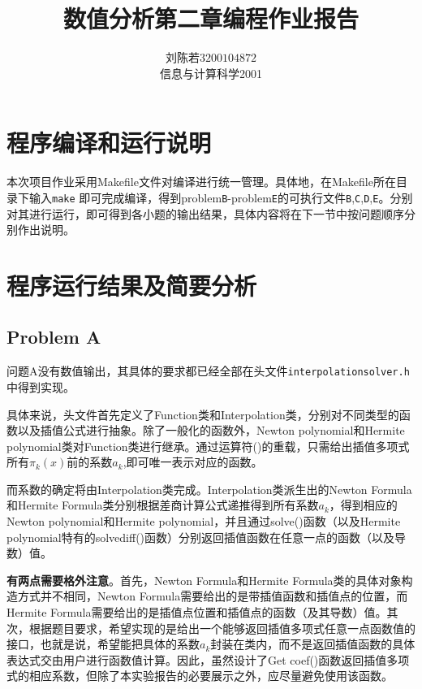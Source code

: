 \documentclass{ctexart}
\begin{document}
\begin{sloppypar}
\title{\vspace{-3cm} \textbf{数值分析第二章编程作业报告}}
\author{刘陈若\;$3200104872$\\信息与计算科学2001}
\date{}

\maketitle

\section*{程序编译和运行说明}
本次项目作业采用Makefile文件对编译进行统一管理。具体地，在Makefile所在目录下输入\verb|make|
即可完成编译，得到problem\verb|B|-problem\verb|E|的可执行文件\verb|B|,\verb|C|,\verb|D|,\verb|E|。分别对其进行运行，即可得到各小题的输出结果，具体内容将在下一节中按问题顺序分别作出说明。

\section*{程序运行结果及简要分析}
\subsection*{Problem A}
问题A没有数值输出，其具体的要求都已经全部在头文件\verb|interpolationsolver.h|中得到实现。

具体来说，头文件首先定义了Function类和Interpolation类，分别对不同类型的函数以及插值公式进行抽象。除了一般化的函数外，Newton polynomial和Hermite polynomial类对Function类进行继承。通过运算符()的重载，只需给出插值多项式所有$\pi_k(x)$前的系数$a_k$,即可唯一表示对应的函数。

而系数的确定将由Interpolation类完成。Interpolation类派生出的Newton Formula和Hermite Formula类分别根据差商计算公式递推得到所有系数$a_k$，得到相应的Newton polynomial和Hermite polynomial，并且通过solve()函数（以及Hermite polynomial特有的solvediff()函数）分别返回插值函数在任意一点的函数（以及导数）值。

\textbf{有两点需要格外注意}。首先，Newton Formula和Hermite Formula类的具体对象构造方式并不相同，Newton Formula需要给出的是带插值函数和插值点的位置，而Hermite Formula需要给出的是插值点位置和插值点的函数（及其导数）值。其次，根据题目要求，希望实现的是给出一个能够返回插值多项式任意一点函数值的接口，也就是说，希望能把具体的系数$a_k$封装在类内，而不是返回插值函数的具体表达式交由用户进行函数值计算。因此，虽然设计了Get coef()函数返回插值多项式的相应系数，但除了本实验报告的必要展示之外，应尽量避免使用该函数。


\end{sloppypar}
\end{document}
